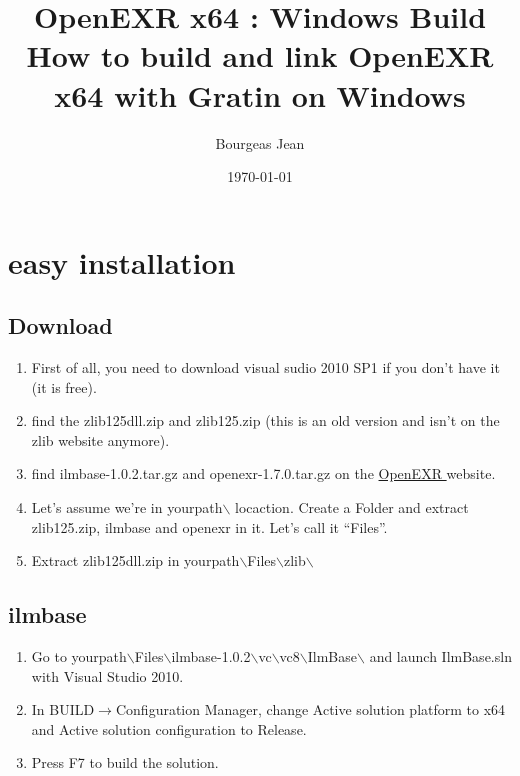 \documentclass{beamer}
\title[OpenEXR x64 : Windows Build]{OpenEXR x64 : Windows Build\\How to build and link OpenEXR x64 with Gratin on Windows}
\author{Bourgeas Jean}
\institute{INRIA}
\date{\today}
\begin{document}
\begin{frame}
  \titlepage
\end{frame}

\section{easy installation}
\subsection{Download}

\begin{frame}
  \begin{enumerate}
    \item First of all, you need to download visual sudio 2010 SP1 if you don't have it (it is free).
    \item find the zlib125dll.zip and zlib125.zip (this is an old version and isn't on the zlib website anymore).
    \item find ilmbase-1.0.2.tar.gz and openexr-1.7.0.tar.gz on the \color{blue}\href{http://www.openexr.com/downloads.html/}{OpenEXR }\color{black} website.
    \item Let's assume we're in yourpath$\backslash$ locaction. Create a Folder and extract zlib125.zip, ilmbase and openexr in it. Let's call it ``Files''.
    \item Extract zlib125dll.zip in yourpath$\backslash$Files$\backslash$zlib$\backslash$
  \end{enumerate}
\end{frame}

\subsection{ilmbase}
\begin{frame}
  \begin{enumerate}
    \item Go to yourpath$\backslash$Files$\backslash$ilmbase-1.0.2$\backslash$vc$\backslash$vc8$\backslash$IlmBase$\backslash$ and launch IlmBase.sln with Visual Studio 2010.
    \item In BUILD$\rightarrow$Configuration Manager, change Active solution platform to x64 and Active solution configuration to Release.
    \item Press F7 to build the solution.
  \end{enumerate}
\end{frame}
\end{document}
